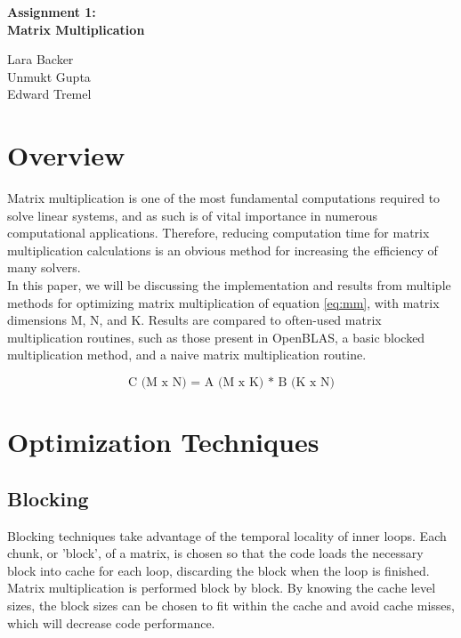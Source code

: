 \documentclass[letterpaper]{article}	 %
\begin{document}
\begin{center}
    \Large
    \textbf{Assignment 1: \\ Matrix Multiplication}
    
    \vspace{0.4cm}
    \large
        
    \vspace{0.4cm}
    Lara Backer \\ Unmukt Gupta \\ Edward Tremel

\end{center}


\section{Overview}

Matrix multiplication is one of the most fundamental computations required to solve linear systems, and as such is of vital importance in numerous computational applications. Therefore, reducing computation time for matrix multiplication calculations is an obvious method for increasing the efficiency of many solvers. \\

In this paper, we will be discussing the implementation and results from multiple methods for optimizing matrix multiplication of equation \ref{eq:mm}, with matrix dimensions M, N, and K. Results are compared to often-used matrix multiplication routines, such as those present in OpenBLAS, a basic blocked multiplication method, and a naive matrix multiplication routine. 

\begin{equation}
\text{C (M x N) = A (M x K) * B (K x N)}
\label{eq:mm}
\end{equation}

\section{Optimization Techniques}

\subsection{Blocking}
Blocking techniques take advantage of the temporal locality of inner loops. Each chunk, or 'block', of a matrix, is chosen so that the code loads the necessary block into cache for each loop, discarding the block when the loop is finished. Matrix multiplication is performed block by block. By knowing the cache level sizes, the block sizes can be chosen to fit within the cache and avoid cache misses, which will decrease code performance. \\ 
\end{document}
